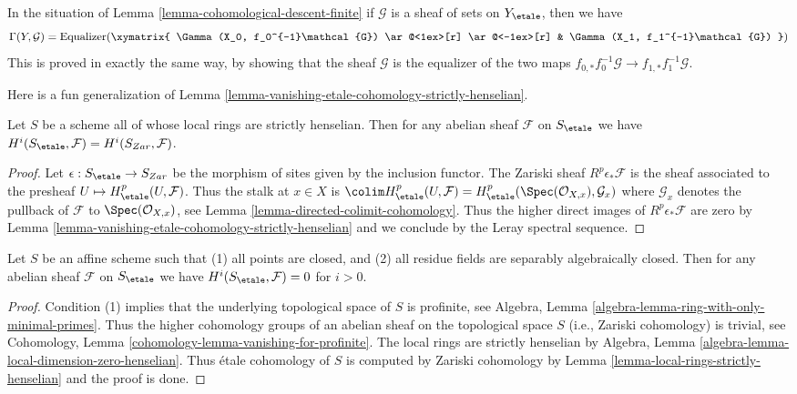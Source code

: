 \begin{remark}
\label{remark-cohomological-descent-finite}
In the situation of Lemma \ref{lemma-cohomological-descent-finite}
if $\mathcal{G}$ is a sheaf of sets on $Y_\etale$, then we have
$$
\Gamma(Y, \mathcal{G}) =
\text{Equalizer}(
\xymatrix{
\Gamma(X_0, f_0^{-1}\mathcal{G})
\ar@<1ex>[r] \ar@<-1ex>[r] &
\Gamma(X_1, f_1^{-1}\mathcal{G})
}
)
$$
This is proved in exactly the same way, by showing that
the sheaf $\mathcal{G}$ is the equalizer of the two maps
$f_{0, *}f_0^{-1}\mathcal{G} \to f_{1, *}f_1^{-1}\mathcal{G}$.
\end{remark}





\noindent
Here is a fun generalization of
Lemma \ref{lemma-vanishing-etale-cohomology-strictly-henselian}.

\begin{lemma}
\label{lemma-local-rings-strictly-henselian}
Let $S$ be a scheme all of whose local rings are strictly henselian.
Then for any abelian sheaf $\mathcal{F}$ on $S_\etale$ we have
$H^i(S_\etale, \mathcal{F}) = H^i(S_{Zar}, \mathcal{F})$.
\end{lemma}

\begin{proof}
Let $\epsilon : S_\etale \to S_{Zar}$ be the morphism of sites given
by the inclusion functor. The Zariski sheaf $R^p\epsilon_*\mathcal{F}$
is the sheaf associated to the presheaf $U \mapsto H^p_\etale(U, \mathcal{F})$.
Thus the stalk at $x \in X$ is
$\colim H^p_\etale(U, \mathcal{F}) =
H^p_\etale(\Spec(\mathcal{O}_{X, x}), \mathcal{G}_x)$
where $\mathcal{G}_x$ denotes the pullback of $\mathcal{F}$
to $\Spec(\mathcal{O}_{X, x})$, see
Lemma \ref{lemma-directed-colimit-cohomology}.
Thus the higher direct images of $R^p\epsilon_*\mathcal{F}$ are
zero by
Lemma \ref{lemma-vanishing-etale-cohomology-strictly-henselian}
and we conclude by the Leray spectral sequence.
\end{proof}

\begin{lemma}
\label{lemma-affine-only-closed-points}
Let $S$ be an affine scheme such that
(1) all points are closed, and (2) all residue fields are separably
algebraically closed. Then
for any abelian sheaf $\mathcal{F}$ on $S_\etale$ we have
$H^i(S_\etale, \mathcal{F}) = 0$ for $i > 0$.
\end{lemma}

\begin{proof}
Condition (1) implies that the underlying topological space
of $S$ is profinite, see
Algebra, Lemma \ref{algebra-lemma-ring-with-only-minimal-primes}.
Thus the higher cohomology groups of an abelian sheaf on the topological
space $S$ (i.e., Zariski cohomology) is trivial, see
Cohomology, Lemma \ref{cohomology-lemma-vanishing-for-profinite}.
The local rings are strictly henselian by
Algebra, Lemma \ref{algebra-lemma-local-dimension-zero-henselian}.
Thus \'etale cohomology of $S$ is computed by Zariski cohomology
by Lemma \ref{lemma-local-rings-strictly-henselian}
and the proof is done.
\end{proof}



